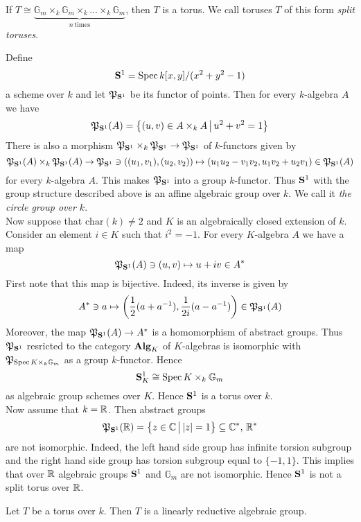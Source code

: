 \begin{example}\label{example:split_torus}
If $T \cong \underbrace{\mathbb{G}_{m}\times_k \mathbb{G}_{m}\times_k ...\times_k \mathbb{G}_{m}}_{n\,\mathrm{times}}$, then $T$ is a torus. We call toruses $T$ of this form \textit{split toruses}.
\end{example}

\begin{example}\label{example:non_split_torus}
Define
$$\mathbf{S}^1 = \mathrm{Spec}\, k[x,y]/(x^2+y^2-1)$$
a scheme over $k$ and let ${\mathfrak P}_{\mathbf{S}^1}$ be its functor of points. Then for every $k$-algebra $A$ we have
$${\mathfrak P}_{\mathbf{S}^1}(A) = \big\{(u,v)\in A\times_k A\,\big|\,u^2+v^2=1\big\}$$
There is also a morphism ${\mathfrak P}_{\mathbf{S}^1}\times_k {\mathfrak P}_{\mathbf{S}^1}\rightarrow {\mathfrak P}_{\mathbf{S}^1}$ of $k$-functors given by
$${\mathfrak P}_{\mathbf{S}^1}(A)\times_k {\mathfrak P}_{\mathbf{S}^1}(A)\rightarrow {\mathfrak P}_{\mathbf{S}^1}\ni \left((u_1,v_1),(u_2,v_2)\right)\mapsto (u_1u_2-v_1v_2,u_1v_2+u_2v_1)\in {\mathfrak P}_{\mathbf{S}^1}(A)$$
for every $k$-algebra $A$. This makes ${\mathfrak P}_{\mathbf{S}^1}$ into a group $k$-functor. Thus $\mathbf{S}^1$ with the group structure described above is an affine algebraic group over $k$. We call it \textit{the circle group over $k$}.\\
Now suppose that $\mathrm{char}(k) \neq 2$ and $K$ is an algebraically closed extension of $k$. Consider an element $i\in K$ such that $i^2 = -1$. For every $K$-algebra $A$ we have a map
$${\mathfrak P}_{\mathbf{S}^1}(A)\ni (u,v)\mapsto u+iv\in A^*$$
First note that this map is bijective. Indeed, its inverse is given by
$$A^*\ni a \mapsto \left(\frac{1}{2}(a+a^{-1}),\frac{1}{2i}(a-a^{-1})\right) \in {\mathfrak P}_{\mathbf{S}^1}(A)$$
Moreover, the map ${\mathfrak P}_{\mathbf{S}^1}(A)\rightarrow A^*$ is a homomorphism of abstract groups. Thus ${\mathfrak P}_{\mathbf{S}^1}$ resricted to the category $\mathbf{Alg}_K$ of $K$-algebras is isomorphic with ${\mathfrak P}_{\mathrm{Spec}\, K\times_k \mathbb{G}_{m}}$ as a group $k$-functor. Hence
$$\mathbf{S}^1_K \cong \mathrm{Spec}\, K\times_k \mathbb{G}_{m}$$
as algebraic group schemes over $K$. Hence $\mathbf{S}^1$ is a torus over $k$.\\
Now assume that $k = {\mathbb R}$. Then abstract groups
$${\mathfrak P}_{\mathbf{S}^1}({\mathbb R}) = \big\{z\in {\mathbb C}\,\big|\,|z|=1\big\} \subseteq {\mathbb C}^*,\,{\mathbb R}^*$$
are not isomorphic. Indeed, the left hand side group has infinite torsion subgroup and the right hand side group has torsion subgroup equal to $\{-1,1\}$. This implies that over ${\mathbb R}$ algebraic groups $\mathbf{S}^1$ and $\mathbb{G}_{m}$ are not isomorphic. Hence $\mathbf{S}^1$ is not a split torus over ${\mathbb R}$.
\end{example}

\begin{corollary}\label{corollary:toruses_are_linearly_reductive}
Let $T$ be a torus over $k$. Then $T$ is a linearly reductive algebraic group.
\end{corollary}

